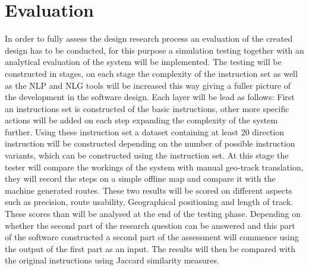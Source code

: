\section{Evaluation}

In order to fully assess the design research process an evaluation of the created design has to be conducted, for this purpose a simulation testing together with an analytical evaluation of the system will be implemented. The testing will be constructed in stages, on each stage the complexity of the instruction set as well as the NLP and NLG tools will be increased this way giving a fuller picture of the development in the software design. Each layer will be lead as follows: First an instructions set is constructed of the basic instructions, other more specific actions will be added on each step expanding the complexity of the system further. Using these instruction set a dataset containing at least 20 direction instruction will be constructed depending on the number of possible instruction variants, which can be constructed using the instruction set. At this stage the tester will compare the workings of the system with manual geo-track translation, they will record the steps on a simple offline map and compare it with the machine generated routes. These two results will be scored on different aspects such as precision, route usability, Geographical positioning and length of track. These scores than will be analysed at the end of the testing phase. Depending on whether the second part of the research question can be answered and this part of the software constructed a second part of the assessment will commence using the output of the first part as an input. The results will then be compared with the original instructions using Jaccard similarity measures.
